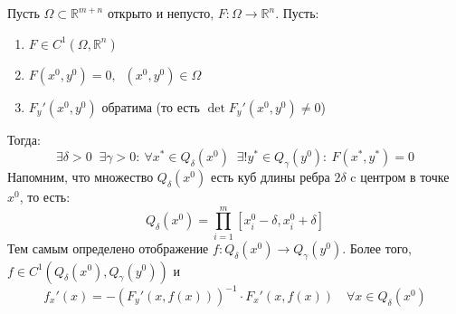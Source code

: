 \documentclass[11pt]{article}
\begin{document}
\begin{theorem}
    Пусть $\Omega \subset \mathbb{R}^{m + n}$ открыто и непусто, $F \colon \Omega \to \mathbb{R}^n$. Пусть:
    \begin{enumerate}
        \item $F \in C^1(\Omega, \mathbb{R}^n)$
        \item $F(x^0, y^0) = 0, \; \; (x^0, y^0) \in \Omega$
        \item $F_y'(x^0, y^0)$ обратима (то есть $\det F_y' (x^0, y^0) \ne 0$)
    \end{enumerate}
    Тогда:
    \[ \exists \delta > 0 \; \; \exists \gamma > 0: \ \forall x^{\ast} \in Q_\delta(x^0)
    \; \; \exists ! y^{\ast} \in Q_\gamma(y^0) : \ F(x^{\ast}, y^{\ast}) = 0\]
    Напомним, что множество $Q_{\delta} (x^0)$ есть куб длины ребра $2 \delta$ c центром в точке $x^0$, то есть:
    \[Q_{\delta} (x^0) = \prod_{i = 1}^{m} \left[x^0_i - \delta, x^0_i + \delta\right]\]
    Тем самым определено отображение $f \colon Q_\delta(x^0) \to Q_\gamma(y^0)$. 
    Более того, $f \in C^1(Q_\delta(x^0), Q_\gamma(y^0))$ и 
    \[f_x'(x) = -(F_y'(x, f(x)))^{-1} \cdot F_x'(x, f(x)) \quad \forall x \in Q_\delta(x^0)\]
\end{theorem}
\end{document}
